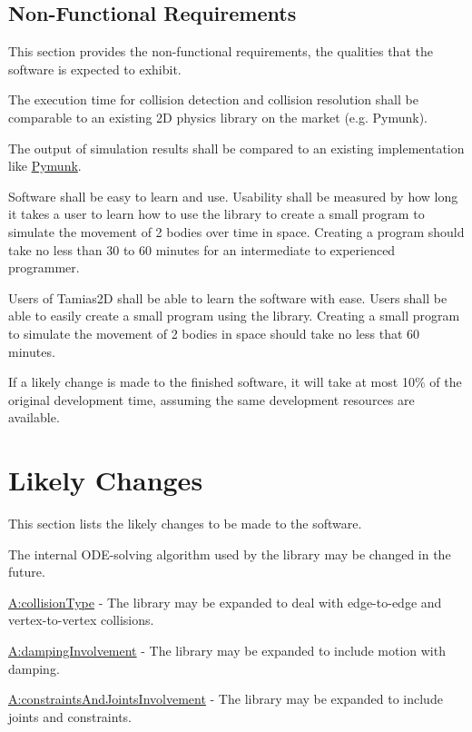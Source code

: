 \documentclass[12pt]{article}
\begin{document}
\subsection{Non-Functional Requirements}
\label{Sec:NFRs}
This section provides the non-functional requirements, the qualities that the software is expected to exhibit.

\begin{description}[font=\normalfont]
\item[Performance:\phantomsection\label{performance}]{The execution time for collision detection and collision resolution shall be comparable to an existing 2D physics library on the market (e.g. Pymunk).}
\item[Correctness:\phantomsection\label{correctness}]{The output of simulation results shall be compared to an existing implementation like \hyperref{http://www.pymunk.org/en/latest/}{}{}{Pymunk}.}
\item[Usability:\phantomsection\label{usability}]{Software shall be easy to learn and use. Usability shall be measured by how long it takes a user to learn how to use the library to create a small program to simulate the movement of 2 bodies over time in space. Creating a program should take no less than 30 to 60 minutes for an intermediate to experienced programmer.}
\item[Understandability:\phantomsection\label{understandability}]{Users of Tamias2D shall be able to learn the software with ease. Users shall be able to easily create a small program using the library. Creating a small program to simulate the movement of 2 bodies in space should take no less that 60 minutes.}
\item[Maintainability:\phantomsection\label{maintainability}]{If a likely change is made to the finished software, it will take at most 10$\%$ of the original development time, assuming the same development resources are available.}
\end{description}
\section{Likely Changes}
\label{Sec:LCs}
This section lists the likely changes to be made to the software.

\begin{description}[font=\normalfont]
\item[Variable-ODE-Solver:\phantomsection\label{lcVODES}]{The internal ODE-solving algorithm used by the library may be changed in the future.}
\item[Expanded-Collisions:\phantomsection\label{lcEC}]{\hyperref[assumpCT]{A:collisionType} - The library may be expanded to deal with edge-to-edge and vertex-to-vertex collisions.}
\item[Include-Dampening:\phantomsection\label{lcID}]{\hyperref[assumpDI]{A:dampingInvolvement} - The library may be expanded to include motion with damping.}
\item[Include-Joints-Constraints:\phantomsection\label{lcIJC}]{\hyperref[assumpCAJI]{A:constraintsAndJointsInvolvement} - The library may be expanded to include joints and constraints.}
\end{description}
\end{document}
